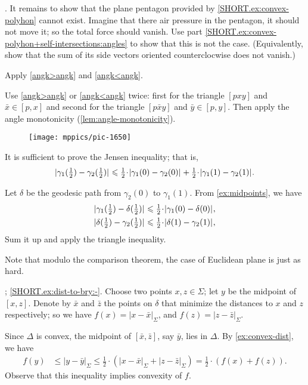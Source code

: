\parit{\ref{SHORT.ex:self-intersections-hard}}.
It remains to show that the plane pentagon provided by \ref{SHORT.ex:convex-polyhon} cannot exist.
Imagine that there air pressure in the pentagon, it should not move it; so the total force should vanish.
Use part \ref{SHORT.ex:convex-polyhon+self-intersections:angles} to show that this is not the case.
(Equivalently, show that the sum of its side vectors oriented counterclocwise does not vanish.)

 Apply \ref{angk>angk} and \ref{angk<angk}.

 Use \ref{angk>angk} or \ref{angk<angk} twice:
first for the triangle $[pxy]$ and $\bar x\in [p,x]$
and 
second for the triangle $[p\bar xy]$ and $\bar y\in [p,y]$.
Then apply the angle monotonicity (\ref{lem:angle-monotonicity}).


{

\begin{wrapfigure}{r}{46 mm}
\vskip-0mm
\centering
\texttt{[image: mppics/pic-1650]}
\end{wrapfigure}

It is sufficient to prove the Jensen inequality;
that is, 
\[
\dist{\gamma_1(\tfrac12)}{\gamma_2(\tfrac12)}{}
\le
\tfrac12\cdot\dist{\gamma_1(0)}{\gamma_2(0)}{}
+
\tfrac12\cdot \dist{\gamma_1(1)}{\gamma_2(1)}{}.
\]


Let $\delta$ be the geodesic path from $\gamma_2(0)$ to $\gamma_1(1)$.
From \ref{ex:midpoints}, we have
\begin{align*}
\dist{\gamma_1(\tfrac12)}{\delta(\tfrac12)}{}
&\le
\tfrac12\cdot\dist{\gamma_1(0)}{\delta(0)}{},
\\
\dist{\delta(\tfrac12)}{\gamma_2(\tfrac12)}{}
&\le
\tfrac12\cdot\dist{\delta(1)}{\gamma_2(1)}{},
\end{align*}
Sum it up and apply the triangle inequality.

 Note that modulo the comparison theorem, 
the case of Euclidean plane is just as hard.

}

\parbf{\ref{ex:dist-to-bry}}; \ref{SHORT.ex:dist-to-bry:-}.
Choose two points $x,z\in\Sigma$;
let $y$ be the midpoint of $[x,z]$.
Denote by $\bar x$ and $\bar z$ the points on $\delta$ that minimize the distances to $x$ and $z$ respectively;
so we have
$f(x)
=|x-\bar x|_\Sigma$,
and $f(z)=|z-\bar z|_\Sigma$.

Since $\Delta$ is convex, the midpoint of $[\bar x,\bar z]$, say  $\bar y$, lies in $\Delta$.
By \ref{ex:convex-dist}, we have 
\begin{align*}
f(y)&\le |y-\bar y|_\Sigma
\le
\tfrac12\cdot(|x-\bar x|_\Sigma
+
|z-\bar z|_\Sigma)
=
\tfrac12\cdot(f(x)+f(z)).
\end{align*}
Observe that this inequality implies convexity of $f$.

